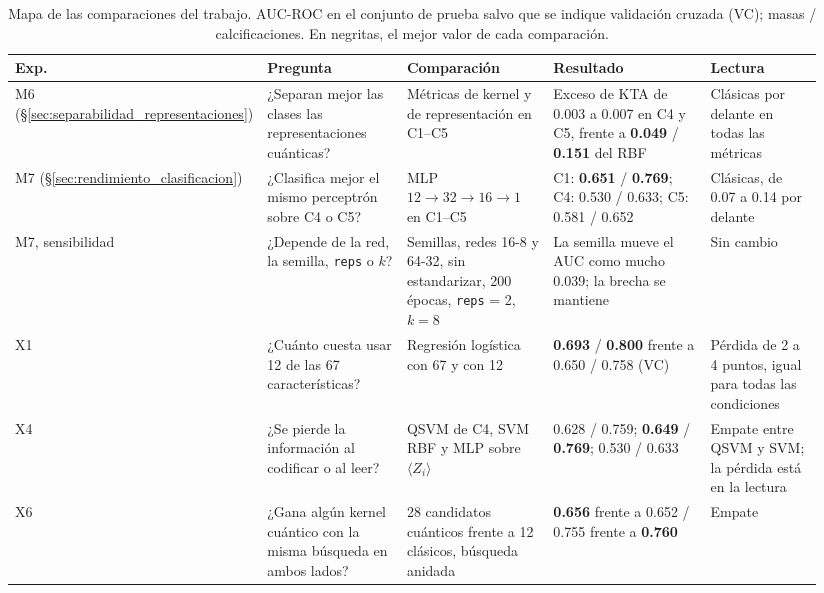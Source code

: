 \begin{table}[htbp]
\centering
\small
\caption{Mapa de las comparaciones del trabajo. AUC-ROC en el conjunto de prueba salvo que se indique validación cruzada (VC); masas / calcificaciones. En negritas, el mejor valor de cada comparación.}
\label{tab:mapa_comparaciones}
\begin{adjustbox}{max width=\linewidth}
\begin{tabular}{p{0.1\linewidth} p{0.2\linewidth} p{0.2\linewidth} p{0.27\linewidth} p{0.17\linewidth}}
\toprule
\textbf{Exp.} & \textbf{Pregunta} & \textbf{Comparación} & \textbf{Resultado} & \textbf{Lectura} \\
\midrule
M6 (\S\ref{sec:separabilidad_representaciones}) & ¿Separan mejor las clases las representaciones cuánticas? & Métricas de kernel y de representación en C1--C5 & Exceso de KTA de 0.003 a 0.007 en C4 y C5, frente a \textbf{0.049} / \textbf{0.151} del RBF & Clásicas por delante en todas las métricas \\
M7 (\S\ref{sec:rendimiento_clasificacion}) & ¿Clasifica mejor el mismo perceptrón sobre C4 o C5? & MLP $12 \to 32 \to 16 \to 1$ en C1--C5 & C1: \textbf{0.651} / \textbf{0.769}; C4: 0.530 / 0.633; C5: 0.581 / 0.652 & Clásicas, de 0.07 a 0.14 por delante \\
M7, sensibilidad & ¿Depende de la red, la semilla, \texttt{reps} o $k$? & Semillas, redes 16-8 y 64-32, sin estandarizar, 200 épocas, \texttt{reps} = 2, $k = 8$ & La semilla mueve el AUC como mucho 0.039; la brecha se mantiene & Sin cambio \\
X1 & ¿Cuánto cuesta usar 12 de las 67 características? & Regresión logística con 67 y con 12 & \textbf{0.693} / \textbf{0.800} frente a 0.650 / 0.758 (VC) & Pérdida de 2 a 4 puntos, igual para todas las condiciones \\
X4 & ¿Se pierde la información al codificar o al leer? & QSVM de C4, SVM RBF y MLP sobre $\langle Z_i\rangle$ & 0.628 / 0.759; \textbf{0.649} / \textbf{0.769}; 0.530 / 0.633 & Empate entre QSVM y SVM; la pérdida está en la lectura \\
X6 & ¿Gana algún kernel cuántico con la misma búsqueda en ambos lados? & 28 candidatos cuánticos frente a 12 clásicos, búsqueda anidada & \textbf{0.656} frente a 0.652 / 0.755 frente a \textbf{0.760} & Empate \\

\end{tabular}
\end{adjustbox}
\end{table}
